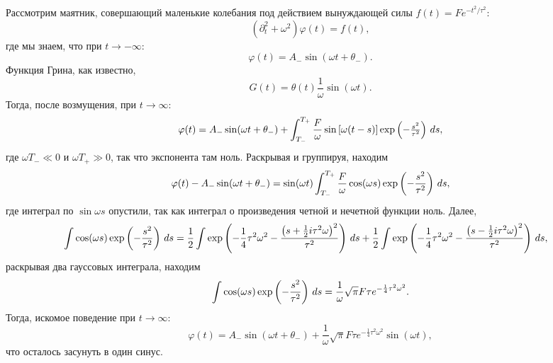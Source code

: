 Рассмотрим маятник, совершающий маленькие колебания под действием вынуждающей силы $f(t) = F e^{-t^2/\tau^2}$:
\begin{equation*}
    \left(\partial_t^2 + \omega^2\right) \varphi(t) = f(t),
\end{equation*}
где мы знаем, что при $t \to - \infty$:
\begin{equation*}
    \varphi(t) = A_- \sin(\omega t + \theta_-).
\end{equation*}
Функция Грина, как известно,
\begin{equation*}
    G(t) = \theta(t) \frac{1}{\omega} \sin(\omega t).
\end{equation*}
Тогда, после возмущения, при $t \to \infty$:
\begin{equation*}
    \varphi(t) = A_- \sin(\omega t + \theta_-) + \int_{T_-}^{T_+} 
    \frac{F}{\omega} \sin\left[\omega(t-s)\right] \exp\left(- \tfrac{s^2}{\tau^2}\right) \, d s,
\end{equation*}
где $\omega T_- \ll 0$ и $\omega T_+ \gg 0$, так что экспонента там ноль. Раскрывая и группируя, находим
\begin{equation*}
    \varphi(t) -  A_- \sin(\omega t + \theta_-) =\sin(\omega t) \int_{T_-}^{T_+}  \frac{F}{\omega} \cos(\omega s) \exp\left(-\frac{s^2}{\tau^2}\right) \, d s,
\end{equation*}
где интеграл по $\sin \omega s$ опустили, так как интеграл о произведения четной и нечетной функции ноль.  Далее,
\begin{align*}
    \int \cos(\omega s) \exp\left(- \frac{s^2}{\tau^2}\right) \, d s &= \frac{1}{2} \int \exp\left(-\frac{1}{4} \tau ^2 \omega ^2-\frac{\left(s+\frac{1}{2} i \tau ^2 \omega \right)^2}{\tau ^2}\right) \, d s  + \frac{1}{2}
    \int \exp\left(
        -\frac{1}{4} \tau ^2 \omega ^2-\frac{\left(s-\frac{1}{2} i \tau ^2 \omega \right)^2}{\tau ^2}
    \right) \, d s,
\end{align*}
раскрывая два гауссовых интеграла, находим
\begin{equation*}
    \int \cos(\omega s) \exp\left(- \frac{s^2}{\tau^2}\right) \, d s = \frac{1}{\omega }\sqrt{\pi } F \tau  e^{-\frac{1}{4} \tau ^2 \omega ^2}.
\end{equation*}
Тогда, искомое поведение при $t \to \infty$:
\begin{equation*}
    \varphi(t)  = A_- \sin(\omega t + \theta_-)  + 
    \frac{1}{\omega }\sqrt{\pi } F \tau  e^{-\frac{1}{4} \tau ^2 \omega ^2}
    \sin(\omega t),
\end{equation*}
что осталось засунуть в один синус.

